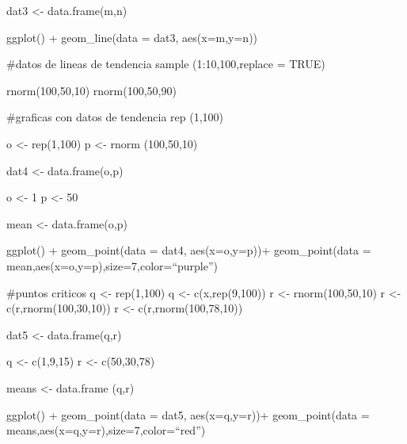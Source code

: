 \documentclass[
]{article}
\begin{document}
dat3 \textless- data.frame(m,n)

ggplot() + geom\_line(data = dat3, aes(x=m,y=n))

\#datos de lineas de tendencia sample (1:10,100,replace = TRUE)

rnorm(100,50,10) rnorm(100,50,90)

\#graficas con datos de tendencia rep (1,100)

o \textless- rep(1,100) p \textless- rnorm (100,50,10)

dat4 \textless- data.frame(o,p)

o \textless- 1 p \textless- 50

mean \textless- data.frame(o,p)

ggplot() + geom\_point(data = dat4, aes(x=o,y=p))+ geom\_point(data =
mean,aes(x=o,y=p),size=7,color=``purple'')

\#puntos criticos q \textless- rep(1,100) q \textless- c(x,rep(9,100)) r
\textless- rnorm(100,50,10) r \textless- c(r,rnorm(100,30,10)) r
\textless- c(r,rnorm(100,78,10))

dat5 \textless- data.frame(q,r)

q \textless- c(1,9,15) r \textless- c(50,30,78)

means \textless- data.frame (q,r)

ggplot() + geom\_point(data = dat5, aes(x=q,y=r))+ geom\_point(data =
means,aes(x=q,y=r),size=7,color=``red'')
\end{document}
